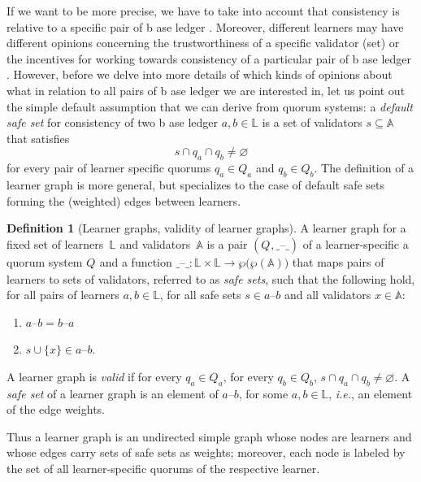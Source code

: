 \documentclass[%
dvipsnames]{article}
\theoremstyle{definition}
\newtheorem{definition}{Definition}
\newcommand{\base}[1][ ]{%
  b\ase[#1]%
}
\newcommand{\ase}[1][ ]{%
  ase ledger%
  \ifthenelse{\equal{#1}{ }}{}{#1}\xspace%
}
\newcommand{\ie}[1][, ]{\emph{i.e.}#1}
\newcommand{\Accs}{%
  \mathbb{A}
}
\newcommand{\Lrnrs}{%
  \mathbb{L}
}
\newcommand{\Q}[1]{%
  Q_{#1}%
}
\newcommand{\q}[2][]{%
  q#1_{#2}%
}
\begin{document}
If we want to be more precise, %
we have to take into account that %
consistency is relative to a specific pair of \base[s]. %
Moreover, different learners may have different opinions concerning
the trustworthiness of a specific validator (set) or %
the incentives for working towards consistency of a particular pair of \base[s]. %
However, %
before we delve into more details of which kinds of opinions about what in relation to
all pairs of \base[s] we are interested in, %
let us point out the simple default assumption that we can derive from quorum systems: %
a \emph{default safe set} for consistency of two \base[s] \(a,b∈\Lrnrs\) %
is a set of validators \(s\subseteq \Accs\) that satisfies
\begin{equation}
  \label{eq:validity}
  s \cap \q{a} \cap \q{b} \neq\varnothing
\end{equation}
for every pair of learner specific quorums \(\q{a} \in \Q{a}\) and \(\q{b} \in
\Q{b}\). 
The definition of a learner graph is more general,
but specializes to the case of default safe sets forming the (weighted) edges between learners. %

\begin{definition}[Learner graphs, validity of learner graphs]
  \label{def:learner-graph} %
  A learner graph for a fixed set of learners \(\Lrnrs\) and
  validators \(\Accs\) is a pair \((\Q{}, \_–\_)\) 
  of a learner-specific a quorum system \(\Q{}\) and %
  a function \({\_–\_} \colon \Lrnrs \times \Lrnrs \to \wp\bigl(\wp(\Accs)\bigr)\)
  that maps pairs of learners to sets of validators, %
  referred to as \emph{safe sets}, %
  such that the following %
  hold, for all pairs of learners \(a,b \in \Lrnrs\),
  for all safe sets \(s \in a–b\) and all validators \(x \in \Accs\):
  \begin{enumerate}
  \item \(a–b = b–a\) %
  \item \(s \cup \{x\} \in  a–b\). %
  \end{enumerate}
  A learner graph is \emph{valid} if %
  for every \(\q{a} \in \Q{a}\), 
  for every \(\q{b} \in \Q{b}\), 
  \(s\cap \q{a} \cap \q{b} \neq \varnothing\). %
  A \emph{safe set} of a learner graph is an element of \(a–b\), for some \(a,b
  \in \Lrnrs\), %
  \ie an element of the edge weights. 
\end{definition}
Thus a learner graph is an undirected simple graph whose nodes are learners  %
and whose  edges carry sets of safe sets as weights; %
moreover, each node is labeled by %
the set of all learner-specific quorums of the respective learner. %
\end{document}
